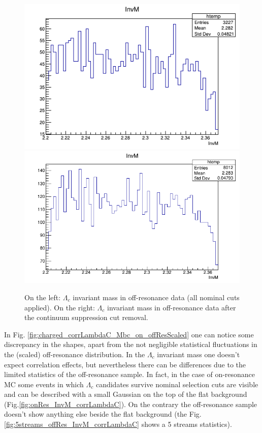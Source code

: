 \begin{figure}
\centering
\subcaptionbox{\label{fig:off-resData_charged_corrLambdaC_InvM}}
{\includegraphics[width=.46\textwidth]{04-chargedCorrBtoLambda/figs/chargedCorrLambdaC_off-resData.png}}\quad
\subcaptionbox{\label{fig:off-resData_charged_corrLambdaC_InvM_woCS}}
{\includegraphics[width=.48\textwidth]{04-chargedCorrBtoLambda/figs/chargedCorrLambdaC_off-resData_woCScuts.png}} \quad
\caption{On the left: $\Lambda_c$ invariant mass in off-resonance data (all nominal cuts applied). On the right: $\Lambda_c$ invariant mass in off-resonance data after the continuum suppression cut removal.}
\end{figure}


In Fig. \ref{fig:charged_corrLambdaC_Mbc_on_offResScaled} one can notice some discrepancy in the shapes, apart from the not negligible statistical fluctuations in the (scaled) off-resonance distribution.  
In the $\Lambda_c$ invariant mass one doesn't expect correlation effects, but nevertheless there can be differences due to the limited statistics of the off-resonance sample. In fact, in the case of on-resonance MC some events in which  $\Lambda_c$ candidates survive nominal selection cuts are visible and can be described with a small Gaussian on the top of the flat background (Fig.\ref{fig:onRes_InvM_corrLambdaC}). On the contrary the off-resonance sample doesn't show anything else beside the flat background (the Fig.\ref{fig:5streams_offRes_InvM_corrLambdaC} shows a 5 streams statistics).


\newpage


